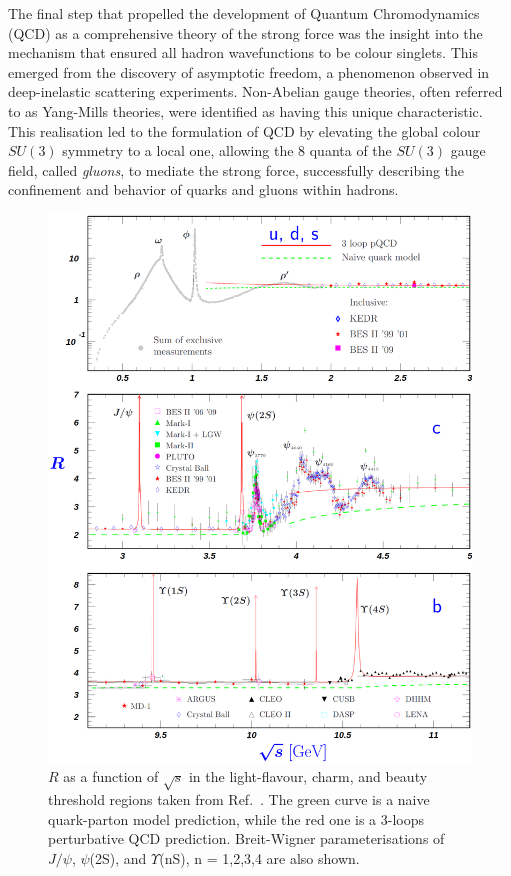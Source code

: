 The final step that propelled the development of Quantum Chromodynamics (QCD) as a comprehensive theory of the strong force was the insight into the mechanism that ensured all hadron wavefunctions to be colour singlets. This emerged from the discovery of asymptotic freedom, a phenomenon observed in deep-inelastic scattering experiments. Non-Abelian gauge theories, often referred to as Yang-Mills theories, were identified as having this unique characteristic. This realisation led to the formulation of QCD by elevating the global colour $SU(3)$ symmetry to a local one, allowing the 8 quanta of the $SU(3)$ gauge field, called \emph{gluons}, to mediate the strong force, successfully describing the confinement and behavior of quarks and gluons within hadrons.

\begin{figure}[p]
    \centering
    \includegraphics[width=\linewidth]{Figures/Chapter 1/rpp2022-R_udscb.png}
    \caption{$R$ as a function of $\sqrt{s}$ in the light-flavour, charm, and beauty threshold regions taken from Ref.~\cite{pdg}. The green curve is a naive quark-parton model prediction, while the red one is a 3-loops perturbative QCD prediction. Breit-Wigner parameterisations of $J/\psi$, $\psi$(2S), and $\Upsilon$(nS), n = 1,2,3,4 are also shown.}
    \label{fig:R_vs_s}
\end{figure}

